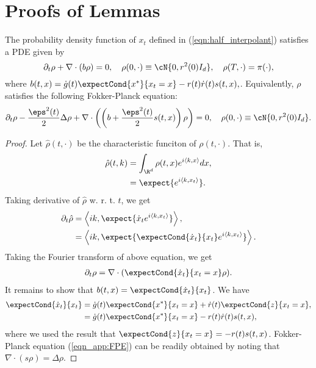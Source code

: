 \section{Proofs of Lemmas}\label{sec:Proofs}
\begin{lemma}\label{lemma_app:pde_density}
The probability density function of $x_t$ defined in (\ref{eqn:half_interpolant}) satisfies a PDE given by
\begin{equation}\label{eqn_app:first_order_pde}
    \partial_t\rho+\nabla\cdot(b\rho) = 0,\quad \rho(0,\cdot) \equiv \cN{0,r^2(0)I_d},\quad \rho(T,\cdot) = \pi(\cdot),
\end{equation}
where $b(t,x) =  \dot g(t)\expectCond{x^*}{x_t=x}-r(t)\dot r(t)s(t,x),$. Equivalently, $\rho$ satisfies the following Fokker-Planck equation:
\begin{equation}\label{eqn_app:FPE}
    \partial_t\rho-\frac{\eps^2(t)}{2}\Delta\rho+\nabla\cdot\left(\left(b+\frac{\eps^2(t)}{2}s(t,x)\right)\rho\right) = 0,\quad \rho(0,\cdot) \equiv \cN{0,r^2(0)I_d}.
\end{equation}
\end{lemma}
\begin{proof}
    Let $\hat{\rho}(t,\cdot)$ be the characteristic funciton of $\rho(t,\cdot)$. That is,
    \begin{align*}
        \hat{\rho}(t,k) &= \int_{\R^d}\rho(t,x)e^{i\langle k,x\rangle}dx,\\
        &= \expect{e^{i\langle k,x_t\rangle}}.
    \end{align*}
    Taking derivative of $\hat{\rho}$ w. r. t. $t$, we get
    \begin{align*}
        \partial_t\hat{\rho} &= \left\langle ik,\expect{\dot x_t e^{i\langle k,x_t\rangle}}\right\rangle,\\
        &= \left\langle ik,\expect{\expectCond{\dot x_t}{x_t} e^{i\langle k,x_t\rangle}}\right\rangle.
    \end{align*}
    Taking the Fourier transform of above equation, we get
    \begin{align*}
        \partial_t\rho = \nabla\cdot(\expectCond{\dot x_t}{x_t=x}\rho).
    \end{align*}
    It remains to show that $b(t,x)=\expectCond{\dot x_t}{x_t}$. We have
    \begin{align*}
        \expectCond{\dot x_t}{x_t} &= \dot g(t)\expectCond{x^*}{x_t=x} + \dot r(t)\expectCond{z}{x_t=x},\\
        & = \dot g(t)\expectCond{x^*}{x_t=x}-r(t)\dot r(t)s(t,x),
    \end{align*}
    where we used the result that $\expectCond{z}{x_t=x} = -r(t)s(t,x)$.
    Fokker-Planck equation (\ref{eqn_app:FPE}) can be readily obtained by noting that $\nabla\cdot(s\rho) = \Delta\rho$.
\end{proof}


